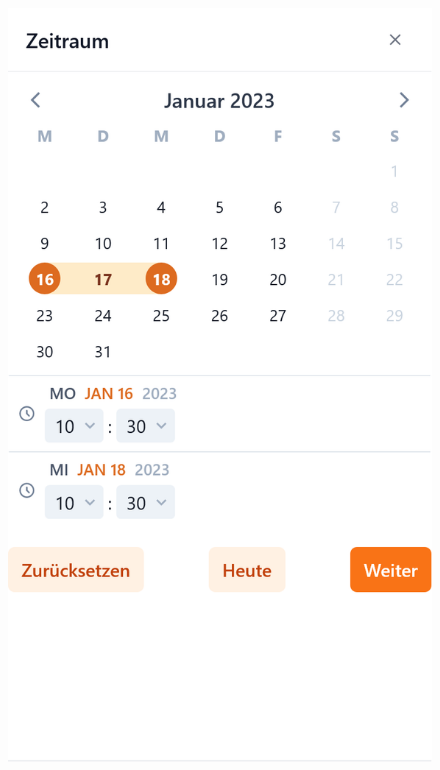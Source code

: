 \begin{figure}[p]
    \centering
    \includegraphics[scale=0.17]{Bilder/Dialgobeispiel/Datum eingeben.png}\hspace{1em}

\end{figure}
